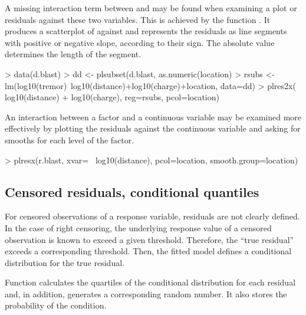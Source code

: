 \documentclass[11pt]{article}
\begin{document}

A missing interaction term between  and  may be found when
examining a plot or residuals against these two variables.
This is achieved by the function .
It produces a scatterplot of  against  and represents the
residuals as line segments with positive or negative slope, according to
their sign. The absolute value determines the length of the segment.

\begin{Schunk}
\begin{Sinput}
> data(d.blast)
> dd <- plsubset(d.blast, as.numeric(location)%in%1:3)
> rsubs <- lm(log10(tremor)~log10(distance)+log10(charge)+location, data=dd)
> plres2x(~ log10(distance) + log10(charge), reg=rsubs, pcol=location)
\end{Sinput}
\end{Schunk}

An interaction between a factor and a continuous variable may be examined
more effectively by plotting the residuals against the continuous variable
and asking for smooths for each level of the factor.

\begin{Schunk}
\begin{Sinput}
> plresx(r.blast, xvar=~ log10(distance), pcol=location, smooth.group=location)
\end{Sinput}
\end{Schunk}

\subsection{Censored residuals, conditional quantiles}

For censored observations of a response variable, residuals are not 
clearly defined.
In the case of right censoring, the underlying response value of a censored
observation is known to exceed a given threshold. Therefore, the 
``true residual'' exceeds a corresponding threshold.
Then, the fitted model defines a conditional distribution for the true residual.


Function  calculates the quartiles of the conditional
distribution for each residual and, in addition, generates a corresponding
random number. It also stores the probability of the condition.
\end{document}
